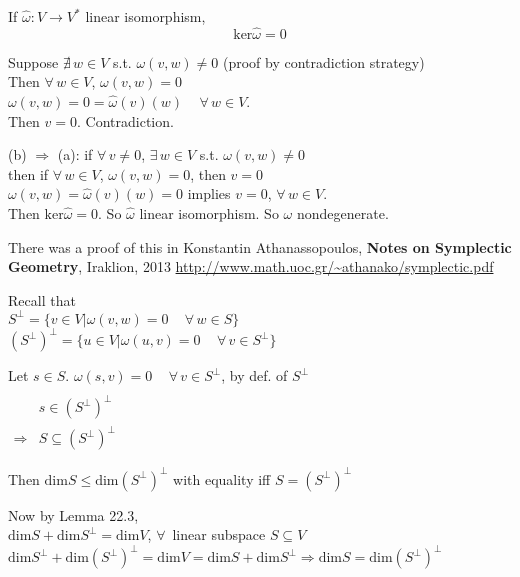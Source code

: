 If $\widehat{\omega}:V\to V^*$ linear isomorphism,  
\[
\text{ker}\widehat{\omega}=0
\]

Suppose $\nexists \, w \in V$ s.t. $\omega(v,w)\neq 0$ (proof by contradiction strategy) \\
Then $\forall \, w \in V$, $\omega(v,w) =0$  \\
$\omega(v,w) = 0 = \widehat{\omega}(v)(w) \quad \, \forall \, w \in V$.  \\
Then $v=0$.  Contradiction.  

(b) $\Longrightarrow $ (a): if $\forall \, v \neq 0$, $\exists \, w \in V$ s.t. $\omega(v,w) \neq 0$ \\
then if $\forall \, w \in V$, $\omega(v,w) =0$, then $v=0$ \\
$\omega(v,w) = \widehat{\omega}(v)(w) = 0$ implies $v=0$, $\forall \, w \in V$.  \\
Then $\text{ker}\widehat{\omega}=0$.  So $\widehat{\omega}$ linear isomorphism.  So $\omega$ nondegenerate.  

 There was a proof of this in Konstantin Athanassopoulos, \textbf{Notes on Symplectic Geometry}, Iraklion, 2013
\url{http://www.math.uoc.gr/~athanako/symplectic.pdf}

Recall that \\
$S^{\perp} = \lbrace v \in V | \omega(v,w) =0 \quad \, \forall \, w \in S \rbrace$ \\
$(S^{\perp})^{\perp} = \lbrace u \in V | \omega(u,v)=0 \quad \, \forall \, v \in S^{\perp}\rbrace$

Let $s\in S$.  $\omega(s,v)=0 \quad \, \forall \, v \in S^{\perp}$, by def. of $S^{\perp}$ \\
$\begin{aligned} & \quad \\
  & s\in (S^{\perp})^{\perp} \\ 
  \Longrightarrow & S \subseteq (S^{\perp})^{\perp} \end{aligned}$

Then $\text{dim}S \leq \text{dim}(S^{\perp})^{\perp}$ with equality iff $S= (S^{\perp})^{\perp}$

Now by Lemma 22.3, \\
$\text{dim}S + \text{dim}S^{\perp} = \text{dim}V$, $\forall \, $ linear subspace $S\subseteq V$ \\
$\text{dim}S^{\perp} + \text{dim}(S^{\perp})^{\perp} = \text{dim}V = \text{dim}S + \text{dim}S^{\perp} \Longrightarrow \text{dim}S = \text{dim}(S^{\perp})^{\perp}$ \\
 
